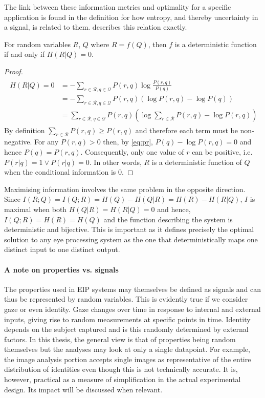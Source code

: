 The link between these information metrics and optimality for a specific application is found in the definition for how entropy, and thereby uncertainty in a signal, is related to them.  describes this relation exactly. 

\begin{theorem}
    For random variables $R$, $Q$ where $R=f(Q)$, then $f$ is a deterministic function if and only if $H(R|Q)=0$.
\end{theorem}

\begin{proof}

\begin{align}\label{eq:pr}
\begin{aligned}
    H(R|Q) = 0 &=-\sum_{r\in\mathcal{R}, q\in\mathcal{Q}} P(r,q)\log\frac{P(r,q)}{P(q)}\\
    &= -\sum_{r\in\mathcal{R}, q\in\mathcal{Q}} P(r,q)\left(\log P(r,q) - \log P(q)\right)\\
    &= \sum_{r\in\mathcal{R}, q\in\mathcal{Q}} P(r, q)\left(\log \sum_{r\in\mathcal{R}} P(r, q) - \log P(r,q)\right)
\end{aligned}
\end{align}
By definition $\sum_{r\in\mathcal{R}} P(r, q) \geq P(r,q)$ and therefore each term must be non-negative. For any $P(r,q) > 0$ then, by \cref{eq:pr}, $P(q) - \log P(r,q) = 0$ and hence $P(q) = P(r,q)$. Consequently, only one value of $r$ can be positive, i.e. $P(r|q) = 1 \vee P(r|q) = 0$. In other words, $R$ is a deterministic function of $Q$ when the conditional information is $0$. 
\end{proof}

Maximising information involves the same problem in the opposite direction. Since $I(R;Q) = I(Q; R) = H(Q) - H(Q|R) = H(R) - H(R|Q)$, $I$ is maximal when both $H(Q|R)=H(R|Q)=0$ and hence, $I(Q;R)=H(R)=H(Q)$ and the function describing the system is deterministic and bijective. This is important as it defines precisely the optimal solution to any eye processing system as the one that deterministically maps one distinct input to one distinct output.

\paragraph{A note on properties vs. signals}
The properties used in EIP systems may themselves be defined as signals and can thus be represented by random variables. This is evidently true if we consider gaze or even identity. Gaze changes over time in response to internal and external inputs, giving rise to random measurements at specific points in time. Identity depends on the subject captured and is this randomly determined by external factors. In this thesis, the general view is that of properties being random themselves but the analyses may look at only a single datapoint. For example, the image analysis portion accepts single images as representative of the entire distribution of identities even though this is not technically accurate. It is, however, practical as a measure of simplification in the actual experimental design. Its impact will be discussed when relevant.

